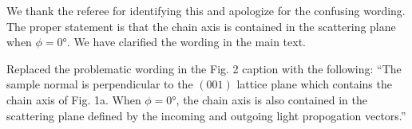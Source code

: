 We thank the referee for identifying this and apologize for the confusing wording.
The proper statement is that the chain axis is contained in the scattering plane when $\phi=\ang{0}$.
We have clarified the wording in the main text.

\begin{changesmade}
Replaced the problematic wording in the Fig. 2 caption with the following: ``The sample normal is perpendicular to the $(001)$ lattice plane which contains the chain axis of Fig. 1a.
When $\phi=\ang{0}$, the chain axis is also contained in the scattering plane defined by the incoming and outgoing light propogation vectors.''
\end{changesmade}
